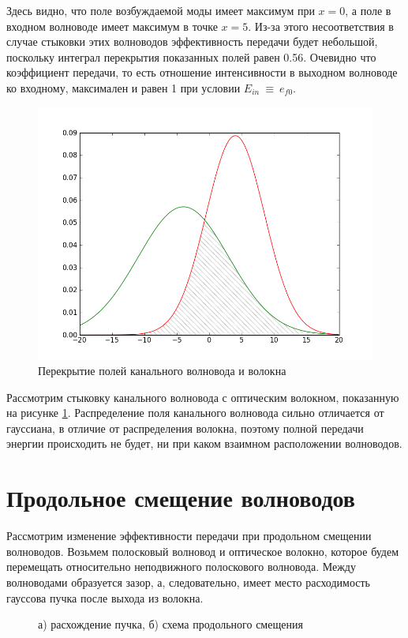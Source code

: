 Здесь видно, что поле возбуждаемой моды имеет максимум при $x=0$, а поле в входном волноводе имеет максимум в точке $x=5$. Из-за этого несоответствия в случае стыковки этих волноводов эффективность передачи будет небольшой, поскольку интеграл перекрытия показанных полей равен 0.56. Очевидно что коэффициент передачи, то есть отношение интенсивности в выходном волноводе ко входному, максимален и равен 1 при условии $E_{in}~\equiv~e_{f0}$.
\begin{figure}[h!]
	\includegraphics[width=.8\textwidth]{img/intersection2.png}
	\caption{Перекрытие полей канального волновода и волокна}
	\label{intersection2}	
\end{figure}

Рассмотрим стыковку канального волновода с оптическим волокном, показанную на рисунке \ref{intersection2}. Распределение поля канального волновода сильно отличается от гауссиана, в отличие от распределения волокна, поэтому полной передачи энергии происходить не будет, ни при каком взаимном расположении волноводов.


\section{Продольное смещение волноводов}
Рассмотрим изменение эффективности передачи при продольном смещении волноводов. Возьмем полосковый волновод и оптическое волокно, которое будем перемещать относительно неподвижного полоскового волновода. Между волноводами образуется зазор, а, следовательно, имеет место расходимость гауссова пучка после выхода из волокна.
\begin{figure}[h!]
	\begin{minipage}[h]{0.49\linewidth}
	\end{minipage}
	\hfill
	\begin{minipage}[h]{0.49\linewidth}
	\end{minipage}
	\caption{а) расхождение пучка, б) схема продольного смещения}
\end{figure}

